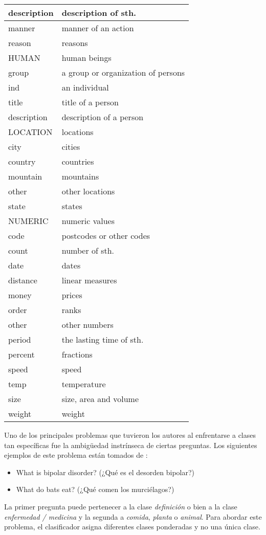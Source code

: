 \begin{center}
\begin{longtable}{| l | l |}
  description & description of sth.\\ \hline
  manner & manner of an action\\ \hline
  reason & reasons\\ \hline
HUMAN & human beings\\ \hline
  group & a group or organization of persons\\ \hline
  ind & an individual\\ \hline
  title & title of a person\\ \hline
  description & description of a person\\ \hline
LOCATION & locations\\ \hline
  city & cities\\ \hline
  country & countries\\ \hline
  mountain & mountains\\ \hline
  other & other locations\\ \hline
  state & states\\ \hline
NUMERIC & numeric values\\ \hline
  code  & postcodes or other codes\\ \hline
  count & number of sth.\\ \hline
  date  & dates\\ \hline
  distance &  linear measures\\ \hline
  money & prices\\ \hline
  order & ranks\\ \hline
  other & other numbers\\ \hline
  period  & the lasting time of sth.\\ \hline
  percent & fractions\\ \hline
  speed & speed\\ \hline
  temp & temperature\\ \hline
  size & size, area and volume\\ \hline
  weight & weight\\ \hline
\end{longtable}
\end{center}


Uno de los principales problemas que tuvieron los autores al enfrentarse a clases tan específicas fue la ambigüedad instrínseca de ciertas preguntas. Los siguientes ejemplos de este problema están tomados de \cite{QC2}:
\begin{itemize}
\item What is bipolar disorder? (¿Qué es el desorden bipolar?)
\item What do bats eat? (¿Qué comen los murciélagos?)
\end{itemize}
La primer pregunta puede pertenecer a la clase \textit{definición} o bien a la clase \textit{enfermedad / medicina} y la segunda a \textit{comida}, \textit{planta} o \textit{animal}. Para abordar este problema, el clasificador asigna diferentes clases ponderadas y no una única clase.

